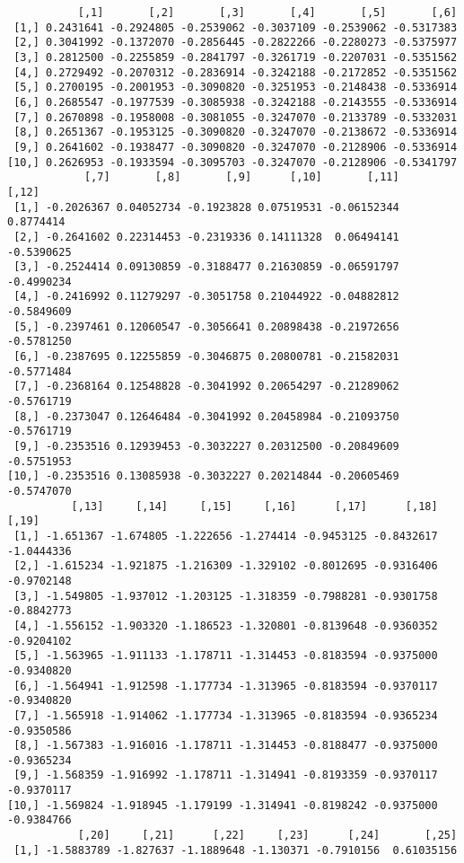 \documentclass[
  letterpaper,
  DIV=11,
  numbers=noendperiod]{scrreprt}
\begin{document}
\begin{verbatim}
           [,1]       [,2]       [,3]       [,4]       [,5]       [,6]
 [1,] 0.2431641 -0.2924805 -0.2539062 -0.3037109 -0.2539062 -0.5317383
 [2,] 0.3041992 -0.1372070 -0.2856445 -0.2822266 -0.2280273 -0.5375977
 [3,] 0.2812500 -0.2255859 -0.2841797 -0.3261719 -0.2207031 -0.5351562
 [4,] 0.2729492 -0.2070312 -0.2836914 -0.3242188 -0.2172852 -0.5351562
 [5,] 0.2700195 -0.2001953 -0.3090820 -0.3251953 -0.2148438 -0.5336914
 [6,] 0.2685547 -0.1977539 -0.3085938 -0.3242188 -0.2143555 -0.5336914
 [7,] 0.2670898 -0.1958008 -0.3081055 -0.3247070 -0.2133789 -0.5332031
 [8,] 0.2651367 -0.1953125 -0.3090820 -0.3247070 -0.2138672 -0.5336914
 [9,] 0.2641602 -0.1938477 -0.3090820 -0.3247070 -0.2128906 -0.5336914
[10,] 0.2626953 -0.1933594 -0.3095703 -0.3247070 -0.2128906 -0.5341797
            [,7]       [,8]       [,9]      [,10]       [,11]      [,12]
 [1,] -0.2026367 0.04052734 -0.1923828 0.07519531 -0.06152344  0.8774414
 [2,] -0.2641602 0.22314453 -0.2319336 0.14111328  0.06494141 -0.5390625
 [3,] -0.2524414 0.09130859 -0.3188477 0.21630859 -0.06591797 -0.4990234
 [4,] -0.2416992 0.11279297 -0.3051758 0.21044922 -0.04882812 -0.5849609
 [5,] -0.2397461 0.12060547 -0.3056641 0.20898438 -0.21972656 -0.5781250
 [6,] -0.2387695 0.12255859 -0.3046875 0.20800781 -0.21582031 -0.5771484
 [7,] -0.2368164 0.12548828 -0.3041992 0.20654297 -0.21289062 -0.5761719
 [8,] -0.2373047 0.12646484 -0.3041992 0.20458984 -0.21093750 -0.5761719
 [9,] -0.2353516 0.12939453 -0.3032227 0.20312500 -0.20849609 -0.5751953
[10,] -0.2353516 0.13085938 -0.3032227 0.20214844 -0.20605469 -0.5747070
          [,13]     [,14]     [,15]     [,16]      [,17]      [,18]      [,19]
 [1,] -1.651367 -1.674805 -1.222656 -1.274414 -0.9453125 -0.8432617 -1.0444336
 [2,] -1.615234 -1.921875 -1.216309 -1.329102 -0.8012695 -0.9316406 -0.9702148
 [3,] -1.549805 -1.937012 -1.203125 -1.318359 -0.7988281 -0.9301758 -0.8842773
 [4,] -1.556152 -1.903320 -1.186523 -1.320801 -0.8139648 -0.9360352 -0.9204102
 [5,] -1.563965 -1.911133 -1.178711 -1.314453 -0.8183594 -0.9375000 -0.9340820
 [6,] -1.564941 -1.912598 -1.177734 -1.313965 -0.8183594 -0.9370117 -0.9340820
 [7,] -1.565918 -1.914062 -1.177734 -1.313965 -0.8183594 -0.9365234 -0.9350586
 [8,] -1.567383 -1.916016 -1.178711 -1.314453 -0.8188477 -0.9375000 -0.9365234
 [9,] -1.568359 -1.916992 -1.178711 -1.314941 -0.8193359 -0.9370117 -0.9370117
[10,] -1.569824 -1.918945 -1.179199 -1.314941 -0.8198242 -0.9375000 -0.9384766
           [,20]     [,21]      [,22]     [,23]      [,24]       [,25]
 [1,] -1.5883789 -1.827637 -1.1889648 -1.130371 -0.7910156  0.61035156

\end{verbatim}
\end{document}
